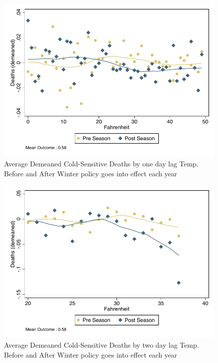 \documentclass[12pt]{article}
\begin{document}
\begin{figure}
\centering
\caption{Average Demeaned Cold-Sensitive Deaths by one day lag Temp. Before and After Winter policy goes into effect each year}
\includegraphics[scale=.8]{figures/tgrad_deaths_ewm_lag1.pdf}
\end{figure}


\begin{figure}
\centering
\caption{Average Demeaned Cold-Sensitive Deaths by  two day lag Temp. Before and After Winter policy goes into effect each year}
\includegraphics[scale=.8]{figures/tgrad_deaths_ewm_lag2.pdf}
\end{figure}




\end{document}
